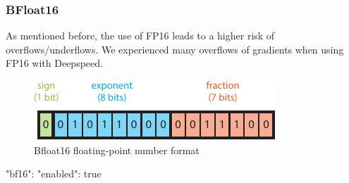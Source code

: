 \subsubsection{BFloat16}

As mentioned before, the use of FP16 leads to a higher risk of overflows/underflows. We experienced many overflows 
of gradients when using FP16 with Deepspeed. 

\begin{figure}[H]
    \centering
    \includegraphics{figures/mixed_precision/bfloat16.pdf}
    \caption{Bfloat16 floating-point number format}
\end{figure}

\begin{json}[language=json,firstnumber=1]
{
    "bf16": {
        "enabled": true
    }
}
\end{json}





